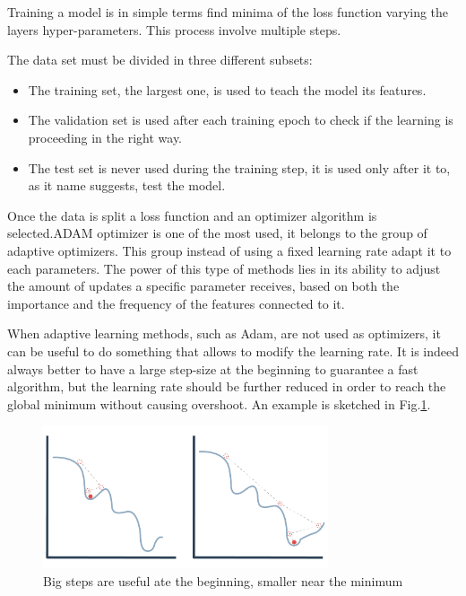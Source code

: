 \documentclass[../../main.tex]{subfiles}
\begin{document}
Training a model is in simple terms find minima of the loss function varying the layers hyper-parameters. This process involve multiple steps.

The data set must be divided in three different subsets:
\begin{itemize}
    \item The training set, the largest one, is used to teach the model its features.
    \item The validation set is used after each training epoch to check if the learning is proceeding in the right way.
    \item The test set is never used during the training step, it is used only after it to, as it name suggests, test the model. 
\end{itemize}

Once the data is split a loss function and an optimizer algorithm is selected.ADAM optimizer \cite{adam} is one of the most used, it belongs to the group of adaptive optimizers. This group instead of using a fixed learning rate adapt it to each parameters.
The power of this type of methods lies in its ability to adjust the amount of updates a specific parameter receives, based on both the importance and the frequency of the features connected to it.   

When adaptive learning methods, such as Adam, are not used as optimizers, it can be useful to do something that allows to modify the learning rate. It is indeed always better to have a large step-size at the beginning to guarantee a fast algorithm, but the learning rate should be further reduced in order to reach the global minimum without causing overshoot. An example is sketched in Fig.\ref{fig:learning rate}. 

\begin{figure}[h]
    \centering
\includegraphics[width=0.75\textwidth]{sections/03/Images/Learning_rate.png}
\caption{Big steps are useful ate the beginning, smaller near the minimum}
    \label{fig:learning rate}
\end{figure}
\end{document}
